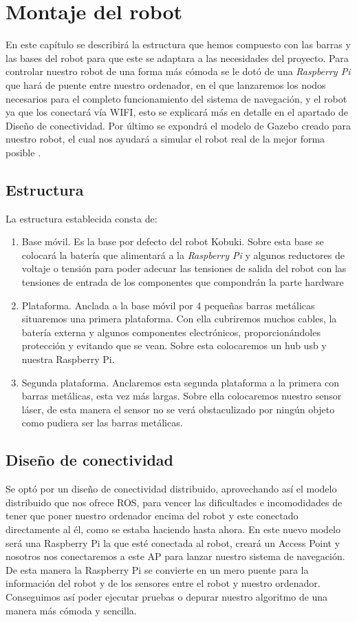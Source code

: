 \chapter{Montaje del robot}
\label{cap:montajedelrobot}
En este capítulo se describirá la estructura que hemos compuesto con las barras y las bases del robot para que este se adaptara a las necesidades del proyecto. Para controlar nuestro robot de una forma más cómoda se le dotó de una \textit{Raspberry Pi} que hará de puente entre nuestro ordenador, en el que lanzaremos los nodos necesarios para el completo funcionamiento del sistema de navegación, y el robot ya que los conectará vía WIFI, esto se explicará más en detalle en el apartado de Diseño de conectividad. Por último se expondrá el modelo de Gazebo creado para nuestro robot, el cual nos ayudará a simular el robot real de la mejor forma posible .

\section{Estructura}
\label{cap:estructuradelrobot}
La estructura establecida consta de:
\begin{enumerate}
\item Base móvil. Es la base por defecto del robot Kobuki. Sobre esta base se colocará la batería que alimentará a la \textit{Raspberry Pi} y algunos reductores de voltaje o tensión para poder adecuar las tensiones de salida del robot con las tensiones de entrada de los componentes que compondrán la parte hardware
\item Plataforma. Anclada a la base móvil por 4 pequeñas barras metálicas situaremos una primera plataforma. Con ella cubriremos muchos cables, la batería externa y algunos componentes electrónicos, proporcionándoles protección y evitando que se vean. Sobre esta colocaremos un hub usb y nuestra Raspberry Pi. 
\item Segunda plataforma. Anclaremos esta segunda plataforma a la primera con barras metálicas, esta vez más largas. Sobre ella colocaremos nuestro sensor láser, de esta manera el sensor no se verá obstaculizado por ningún objeto como pudiera ser las barras metálicas.
\end{enumerate}

\section{Diseño de conectividad}
\label{cap:conectividad}
Se optó por un diseño de conectividad distribuido, aprovechando así el modelo distribuido que nos ofrece ROS, para vencer las dificultades e incomodidades de tener que poner nuestro ordenador encima del robot y este conectado directamente al él, como se estaba haciendo hasta ahora. En este nuevo modelo será una Raspberry Pi la que esté conectada al robot, creará un Access Point y nosotros nos conectaremos a este AP para lanzar nuestro sistema de navegación. De esta manera la Raspberry Pi se convierte en un mero puente para la información del robot y de los sensores entre el robot y nuestro ordenador. Conseguimos así poder ejecutar pruebas o depurar nuestro algoritmo de una manera más cómoda y sencilla. 

